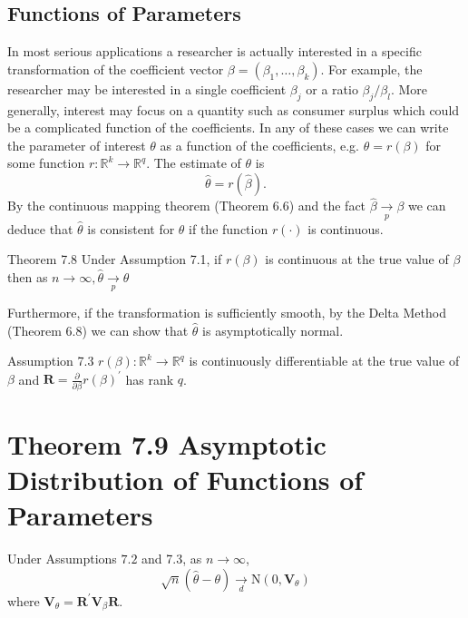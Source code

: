 \documentclass[10pt]{article}
\begin{document}
\subsection{Functions of Parameters}
In most serious applications a researcher is actually interested in a specific transformation of the coefficient vector $\beta=\left(\beta_{1}, \ldots, \beta_{k}\right)$. For example, the researcher may be interested in a single coefficient $\beta_{j}$ or a ratio $\beta_{j} / \beta_{l}$. More generally, interest may focus on a quantity such as consumer surplus which could be a complicated function of the coefficients. In any of these cases we can write the parameter of interest $\theta$ as a function of the coefficients, e.g. $\theta=r(\beta)$ for some function $r: \mathbb{R}^{k} \rightarrow \mathbb{R}^{q}$. The estimate of $\theta$ is
$$
\widehat{\theta}=r(\widehat{\beta}) .
$$
By the continuous mapping theorem (Theorem 6.6) and the fact $\widehat{\beta} \underset{p}{\longrightarrow} \beta$ we can deduce that $\widehat{\theta}$ is consistent for $\theta$ if the function $r(\cdot)$ is continuous.

Theorem 7.8 Under Assumption 7.1, if $r(\beta)$ is continuous at the true value of $\beta$ then as $n \rightarrow \infty, \widehat{\theta} \underset{p}{\longrightarrow} \theta$

Furthermore, if the transformation is sufficiently smooth, by the Delta Method (Theorem 6.8) we can show that $\widehat{\theta}$ is asymptotically normal.

Assumption 7.3 $r(\beta): \mathbb{R}^{k} \rightarrow \mathbb{R}^{q}$ is continuously differentiable at the true value of $\beta$ and $\boldsymbol{R}=\frac{\partial}{\partial \beta} r(\beta)^{\prime}$ has rank $q$.

\section{Theorem 7.9 Asymptotic Distribution of Functions of Parameters}
Under Assumptions $7.2$ and 7.3, as $n \rightarrow \infty$,
$$
\sqrt{n}(\widehat{\theta}-\theta) \underset{d}{\longrightarrow} \mathrm{N}\left(0, \boldsymbol{V}_{\theta}\right)
$$
where $\boldsymbol{V}_{\theta}=\boldsymbol{R}^{\prime} \boldsymbol{V}_{\beta} \boldsymbol{R}$.
\end{document}
